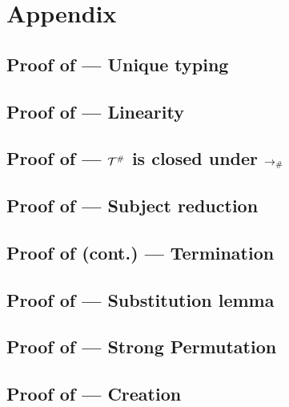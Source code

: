 \chapter{Appendix}

\section{Proof of  --- Unique typing}
\label{unique_typing_proof}


\section{Proof of  --- Linearity}
\label{linearity_proof}


\section{Proof of  --- $\mathcal{T}^{\mathtt{\#}}$ is closed under $\mathrel{\to_{\mathtt{\#}}}$}
\label{closed_under_arrow_proof}


\section{Proof of  --- Subject reduction}
\label{subject_reduction_proof}


\section{Proof of  (cont.) --- Termination}
\label{termination_proof}


\section{Proof of  --- Substitution lemma}
\label{substitution_lemma_proof}


\section{Proof of  --- Strong Permutation}
\label{strong_permutation_proof}


\section{Proof of  --- Creation}
\label{creation_proof}


